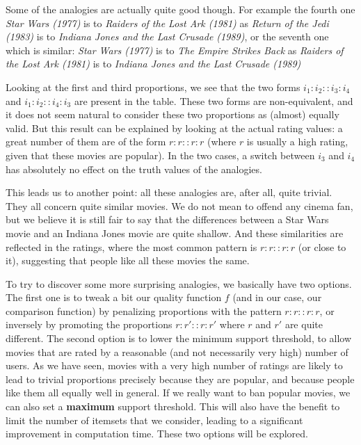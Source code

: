 Some of the analogies are actually quite good though. For example the fourth
one \textit{Star Wars (1977)} is to \textit{Raiders of the Lost Ark (1981)} as
\textit{Return of the Jedi (1983)} is to \textit {Indiana Jones and the Last
Crusade (1989)}, or the seventh one which is similar: \textit{Star Wars (1977)}
is to \textit{The Empire Strikes Back} as \textit{Raiders of the Lost Ark
(1981)} is to \textit{Indiana Jones and the Last Crusade (1989)}

Looking at the first and third proportions, we see that the two forms
$i_1:i_2::i_3:i_4$ and $i_1:i_2::i_4:i_3$ are present in the table. These two
forms are non-equivalent, and it does not seem natural to consider these two
proportions as (almost) equally valid. But this result can be explained by
looking at the actual rating values: a great number of them are of the form
$r:r::r:r$ (where $r$ is usually a high rating, given that these movies are
popular). In the two cases, a switch between $i_3$ and $i_4$ has absolutely no
effect on the truth values of the analogies.

This leads us to another point: all these analogies are, after all, quite
trivial. They all concern quite similar movies. We do not mean to offend any
cinema fan, but we believe it is still fair to say that the differences between
a Star Wars movie and an Indiana Jones movie are quite shallow. And these
similarities are reflected in the ratings, where the most common pattern is
$r:r::r:r$ (or close to it), suggesting that people like all these movies the
same.

To try to discover some more surprising analogies, we basically have two
options. The first one is to tweak a bit our quality function $f$ (and in our
case, our comparison function) by penalizing proportions with the pattern
$r:r::r:r$, or inversely by promoting the proportions $r : r' :: r :r'$ where
$r$ and $r'$ are quite different. The second option is to lower the minimum
support threshold, to allow movies that are rated by a reasonable (and not
necessarily very high) number of users. As we have seen, movies with a very
high number of ratings are likely to lead to trivial proportions precisely
because they are popular, and because people like them all equally well in
general. If we really want to ban popular movies, we can also set a
\textbf{maximum} support threshold. This will also have the benefit to limit
the number of itemsets that we consider, leading to a significant improvement
in computation time. These two options will be explored.

